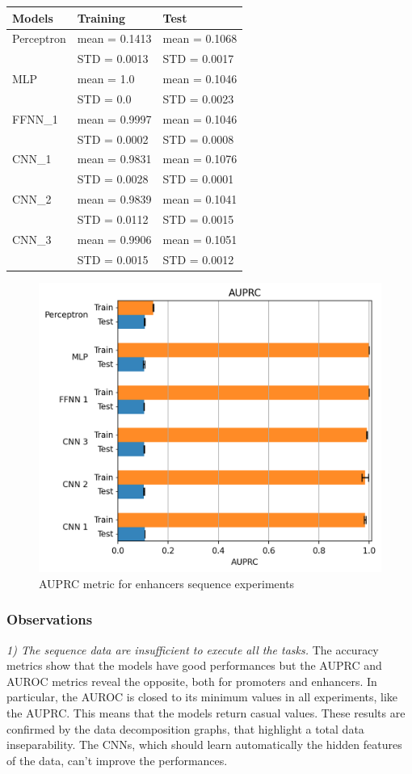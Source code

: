 \begin{longtable}[]{@{}lll@{}}
\toprule
\textbf{Models} & \textbf{Training} & \textbf{Test}\tabularnewline
\midrule
\endhead
Perceptron & mean = 0.1413 & mean = 0.1068\tabularnewline
& STD = 0.0013 & STD = 0.0017\tabularnewline
MLP & mean = 1.0 & mean = 0.1046\tabularnewline
& STD = 0.0 & STD = 0.0023\tabularnewline
FFNN\_1 & mean = 0.9997 & mean = 0.1046\tabularnewline
& STD = 0.0002 & STD = 0.0008\tabularnewline
CNN\_1 & mean = 0.9831 & mean = 0.1076\tabularnewline
& STD = 0.0028 & STD = 0.0001\tabularnewline
CNN\_2 & mean = 0.9839 & mean = 0.1041\tabularnewline
& STD = 0.0112 & STD = 0.0015\tabularnewline
CNN\_3 & mean = 0.9906 & mean = 0.1051\tabularnewline
& STD = 0.0015 & STD = 0.0012\tabularnewline
\bottomrule
\end{longtable}

\begin{figure}[h!]
\centering
\includegraphics[width=0.8\linewidth]{../images/sequence_results/enhancers/auprc.png}
\caption{AUPRC metric for enhancers sequence experiments}
\end{figure}

\subsubsection{Observations}\label{header-n1829}

\emph{1) The sequence data are insufficient to execute all the tasks.}
The accuracy metrics show that the models have good performances but the
AUPRC and AUROC metrics reveal the opposite, both for promoters and
enhancers. In particular, the AUROC is closed to its minimum values in
all experiments, like the AUPRC. This means that the models return
casual values. These results are confirmed by the data decomposition
graphs, that highlight a total data inseparability. The CNNs, which
should learn automatically the hidden features of the data, can't
improve the performances.

